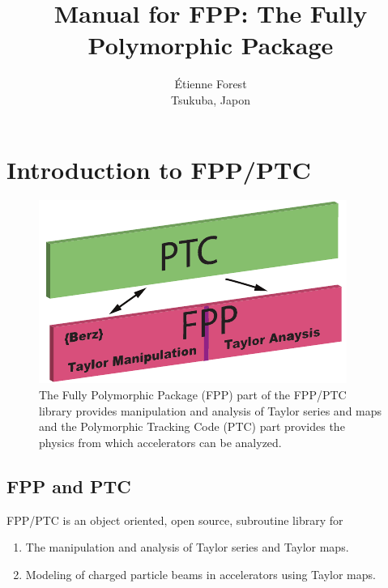\documentclass[english,12pt,article]{article} %
\title{ \protect \large Manual for FPP:   The Fully Polymorphic Package}
\author{Étienne Forest \\ Tsukuba, Japon }
\begin{document}
 


\newpage 
{\footnotesize
\tableofcontents %
}
\newpage 
\maketitle
\section{Introduction to FPP/PTC}
\label{sec:fppptc}

\begin{figure}[tb]
  \centering
  \includegraphics{FPP-PTC.pdf}
  \caption{The Fully Polymorphic Package (FPP) part of the FPP/PTC library provides manipulation and analysis of Taylor series and maps and the Polymorphic Tracking Code (PTC) part provides the physics from which accelerators can be analyzed.}
  \label{f:fpp-ptc}
\end{figure}

\subsection{FPP and PTC}

FPP/PTC is an object oriented, open source, subroutine library for
\begin{enumerate}[itemsep=-0.5ex, topsep=-0.4ex]
\item The manipulation and analysis of Taylor series and Taylor maps.
\item Modeling of charged particle beams in accelerators using Taylor maps.
\end{enumerate}
\end{document}
